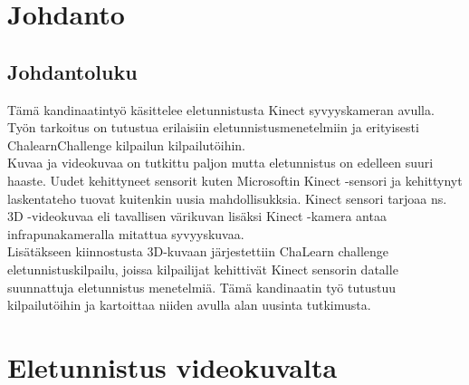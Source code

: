 
\section{Johdanto}



\subsection{Johdantoluku}

Tämä kandinaatintyö käsittelee eletunnistusta Kinect syvyyskameran avulla. 
Työn tarkoitus on tutustua erilaisiin eletunnistusmenetelmiin ja erityisesti ChalearnChallenge kilpailun kilpailutöihin. 
\\
Kuvaa ja videokuvaa on tutkittu paljon mutta eletunnistus on edelleen suuri haaste. Uudet kehittyneet
sensorit kuten Microsoftin Kinect -sensori ja kehittynyt laskentateho tuovat kuitenkin uusia mahdollisukksia. 
Kinect sensori tarjoaa ns. 3D -videokuvaa eli tavallisen värikuvan lisäksi Kinect -kamera antaa infrapunakameralla mitattua syvyyskuvaa.\\

Lisätäkseen kiinnostusta 3D-kuvaan järjestettiin ChaLearn challenge eletunnistuskilpailu, joissa kilpailijat kehittivät Kinect sensorin datalle suunnattuja 
eletunnistus menetelmiä. Tämä kandinaatin työ tutustuu kilpailutöihin ja kartoittaa niiden avulla alan uusinta tutkimusta. \\



\section{Eletunnistus videokuvalta}
\label{Eletunnistus videokuvalta}



